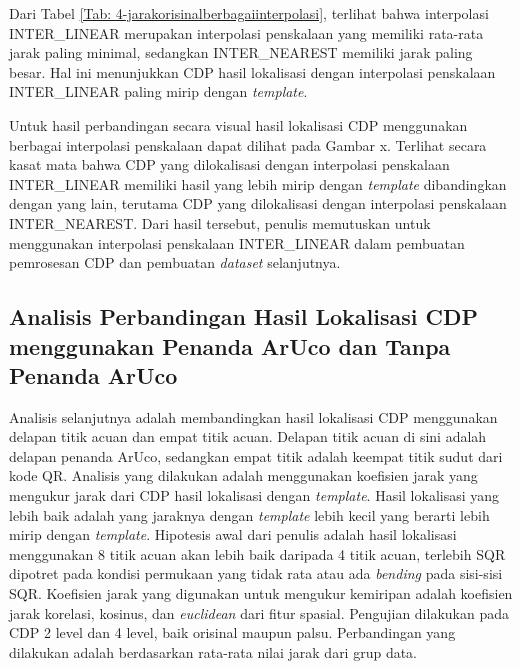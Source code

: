 \noindent Dari Tabel \ref{Tab: 4-jarakorisinalberbagaiinterpolasi}, terlihat bahwa interpolasi INTER\_LINEAR merupakan interpolasi penskalaan yang memiliki rata-rata jarak paling minimal, sedangkan INTER\_NEAREST memiliki jarak paling besar. Hal ini menunjukkan CDP hasil lokalisasi dengan interpolasi penskalaan INTER\_LINEAR paling mirip dengan \emph{template}.

Untuk hasil perbandingan secara visual hasil lokalisasi CDP menggunakan berbagai interpolasi penskalaan dapat dilihat pada Gambar x. Terlihat secara kasat mata
bahwa CDP yang dilokalisasi dengan interpolasi penskalaan INTER\_LINEAR memiliki hasil yang lebih mirip dengan \emph{template} dibandingkan dengan yang lain,
terutama CDP yang dilokalisasi dengan interpolasi penskalaan INTER\_NEAREST. Dari hasil tersebut, penulis memutuskan untuk menggunakan interpolasi penskalaan
INTER\_LINEAR dalam pembuatan pemrosesan CDP dan pembuatan \emph{dataset} selanjutnya.

\subsection{Analisis Perbandingan Hasil Lokalisasi CDP menggunakan Penanda ArUco dan Tanpa Penanda ArUco}
Analisis selanjutnya adalah membandingkan hasil lokalisasi CDP menggunakan delapan titik acuan dan empat titik acuan. Delapan titik acuan di sini adalah
delapan penanda ArUco, sedangkan empat titik adalah keempat titik sudut dari kode QR. Analisis yang dilakukan adalah menggunakan koefisien jarak yang mengukur
jarak dari CDP hasil lokalisasi dengan \emph{template}. Hasil lokalisasi yang lebih baik adalah yang jaraknya dengan \emph{template} lebih kecil yang berarti
lebih mirip dengan \emph{template}. Hipotesis awal dari penulis adalah hasil lokalisasi menggunakan 8 titik acuan akan lebih baik daripada 4 titik acuan,
terlebih SQR dipotret pada kondisi permukaan yang tidak rata atau ada \emph{bending} pada sisi-sisi SQR. Koefisien jarak yang digunakan untuk mengukur
kemiripan adalah koefisien jarak korelasi, kosinus, dan \emph{euclidean} dari fitur spasial. Pengujian dilakukan pada CDP 2 level dan 4 level, baik orisinal
maupun palsu. Perbandingan yang dilakukan adalah berdasarkan rata-rata nilai jarak dari grup data.

